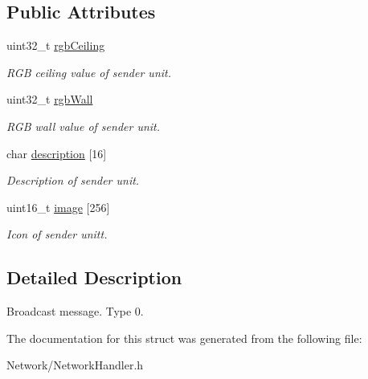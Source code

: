\subsection*{Public Attributes}
\begin{DoxyCompactItemize}
\item 
\mbox{\label{structNetworkHandler_1_1BroadcastMessage_ae41fb3a119ecb6dcc8e0bd7b30bba836}} 
uint32\+\_\+t \mbox{\hyperlink{structNetworkHandler_1_1BroadcastMessage_ae41fb3a119ecb6dcc8e0bd7b30bba836}{rgb\+Ceiling}}
\begin{DoxyCompactList}\small\item\em R\+GB ceiling value of sender unit. \end{DoxyCompactList}\item 
\mbox{\label{structNetworkHandler_1_1BroadcastMessage_a60dfde06603616556ccda32917408f4e}} 
uint32\+\_\+t \mbox{\hyperlink{structNetworkHandler_1_1BroadcastMessage_a60dfde06603616556ccda32917408f4e}{rgb\+Wall}}
\begin{DoxyCompactList}\small\item\em R\+GB wall value of sender unit. \end{DoxyCompactList}\item 
\mbox{\label{structNetworkHandler_1_1BroadcastMessage_a759ee3b4d1f21f4f5fd107f943f6b984}} 
char \mbox{\hyperlink{structNetworkHandler_1_1BroadcastMessage_a759ee3b4d1f21f4f5fd107f943f6b984}{description}} \mbox{[}16\mbox{]}
\begin{DoxyCompactList}\small\item\em Description of sender unit. \end{DoxyCompactList}\item 
\mbox{\label{structNetworkHandler_1_1BroadcastMessage_a7e3e051c6a20003c7ee62649a80b4dcd}} 
uint16\+\_\+t \mbox{\hyperlink{structNetworkHandler_1_1BroadcastMessage_a7e3e051c6a20003c7ee62649a80b4dcd}{image}} \mbox{[}256\mbox{]}
\begin{DoxyCompactList}\small\item\em Icon of sender unitt. \end{DoxyCompactList}\end{DoxyCompactItemize}


\subsection{Detailed Description}
Broadcast message. Type 0. 

The documentation for this struct was generated from the following file\+:\begin{DoxyCompactItemize}
\item 
Network/Network\+Handler.\+h\end{DoxyCompactItemize}
